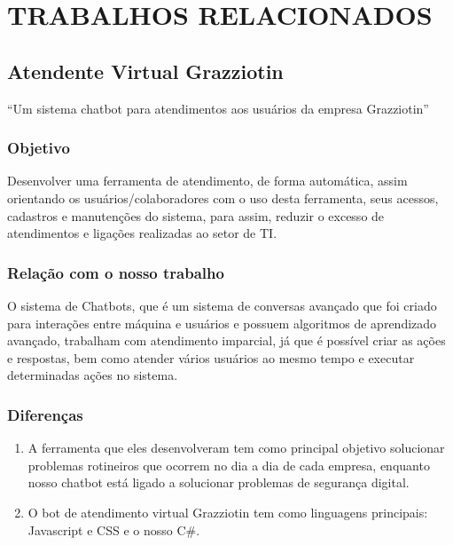 \chapter{\uppercase{Trabalhos Relacionados}}
\label{TrabalhosRelacionados}

\section{Atendente Virtual Grazziotin}
    
    \begin{center}
        “Um sistema chatbot para atendimentos aos usuários da empresa Grazziotin”
    \end{center}
    
    \subsection{Objetivo}
        Desenvolver uma ferramenta de atendimento, de forma automática, assim orientando os usuários/colaboradores com o uso desta ferramenta, seus acessos, cadastros e manutenções do sistema, para assim, reduzir o excesso de atendimentos e ligações realizadas ao setor de TI.
        
    \subsection{Relação com o nosso trabalho}
        O sistema de Chatbots, que é um sistema de conversas avançado que foi criado para interações entre máquina e usuários e possuem algoritmos de aprendizado avançado, trabalham com atendimento imparcial, já que é possível criar as ações e respostas, bem como atender vários usuários ao mesmo tempo e executar determinadas ações no sistema.
    
    \subsection{Diferenças}
        \begin{enumerate}
            \item 
                A ferramenta que eles desenvolveram tem como principal objetivo solucionar problemas rotineiros que ocorrem no dia a dia de cada empresa, enquanto nosso chatbot está ligado a solucionar problemas de segurança digital.
            \item
                O bot de atendimento virtual Grazziotin tem como linguagens principais: Javascript e CSS e o nosso C\#.
        \end{enumerate}
    

